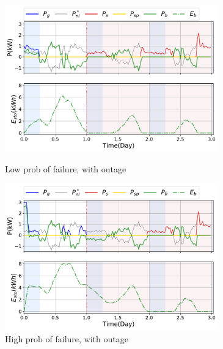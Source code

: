 \documentclass{ifacconf}
\begin{document}
\begin{figure}[!ht]
    \begin{minipage}{.49\linewidth}
        \includegraphics[height=2.5in,width=1\linewidth]{Figures/Mc_LowFailYesOut.pdf}
        \caption{Low prob of failure, with outage}
        \label{fig:LOwFailYesOut}    
    \end{minipage}%
    \begin{minipage}{.01\linewidth}
      \hspace{1px}
    \end{minipage}%
    \begin{minipage}{0.49\linewidth}
        \includegraphics[height=2.5in,width=1\columnwidth]{Figures/Mc_HighFailYesOut.pdf} 
        \caption{High prob of failure, with outage}
        \label{fig:HighFailYesOut}
    \end{minipage}
\end{figure}
\end{document}
